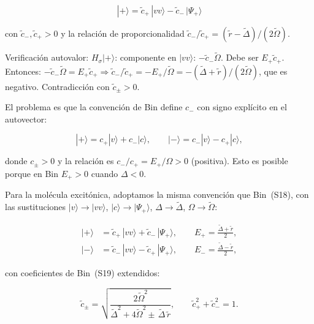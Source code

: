 \documentclass[12pt]{article}
\begin{document}
\begin{equation}
	|+\rangle = \tilde{c}_+\,|vv\rangle - \tilde{c}_-\,|\Psi_+\rangle
\end{equation}

\noindent
con $\tilde{c}_-, \tilde{c}_+ > 0$ y la relaci\'on de proporcionalidad
$\tilde{c}_-/\tilde{c}_+ = (\tilde{r}-\widetilde\Delta)/(2\widetilde\Omega)$.

Verificaci\'on autovalor:
$H_\sigma|+\rangle$: componente en $|vv\rangle$: $-\tilde{c}_-\widetilde\Omega$.
Debe ser $E_+\tilde{c}_+$. Entonces:
$-\tilde{c}_-\widetilde\Omega = E_+\tilde{c}_+ \Longrightarrow
\tilde{c}_-/\tilde{c}_+ = -E_+/\widetilde\Omega
= -(\widetilde\Delta+\tilde{r})/(2\widetilde\Omega)$,
que es negativo. Contradicci\'on con $\tilde{c}_\pm > 0$.

El problema es que la convenci\'on de Bin define $c_-$ con signo
expl\'icito en el autovector:

\begin{equation}
	|+\rangle = c_+|v\rangle + c_-|c\rangle, \qquad
	|-\rangle = c_-|v\rangle - c_+|c\rangle,
\end{equation}

donde $c_\pm > 0$ y la relaci\'on es
$c_-/c_+ = E_+/\Omega > 0$ (positiva).
Esto es posible porque en Bin $E_+ > 0$ cuando $\Delta < 0$.

\medskip
\noindent
Para la mol\'ecula excit\'onica, adoptamos la misma convenci\'on que
Bin~(S18), con las sustituciones $|v\rangle \to |vv\rangle$,
$|c\rangle \to |\Psi_+\rangle$, $\Delta \to \widetilde\Delta$,
$\Omega \to \widetilde\Omega$:

\begin{align}
	|{+}\rangle &= \tilde{c}_+\,|vv\rangle + \tilde{c}_-\,|\Psi_+\rangle,
	\qquad E_+ = \frac{\widetilde\Delta + \tilde{r}}{2},
	\label{eq:ket_p_final}\\[6pt]
	|{-}\rangle &= \tilde{c}_-\,|vv\rangle - \tilde{c}_+\,|\Psi_+\rangle,
	\qquad E_- = \frac{\widetilde\Delta - \tilde{r}}{2},
	\label{eq:ket_m_final}
\end{align}

\noindent
con coeficientes de Bin~(S19) extendidos:

\begin{equation}
	\tilde{c}_\pm = \sqrt{\frac{2\widetilde\Omega^2}
		{\widetilde\Delta^2 + 4\widetilde\Omega^2
			\pm\,\widetilde\Delta\,\tilde{r}}},
	\qquad \tilde{c}_+^2 + \tilde{c}_-^2 = 1.
	\label{eq:cpm_final}
\end{equation}
\end{document}
